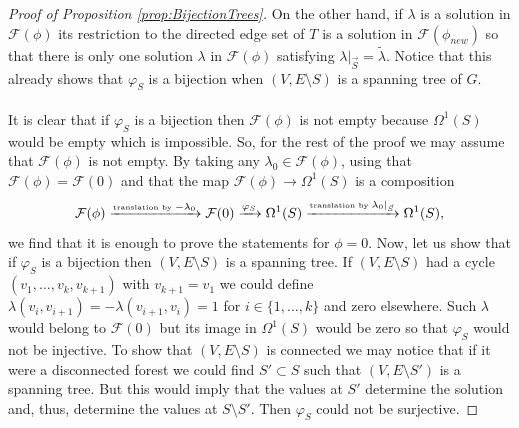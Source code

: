 \documentclass[11pt,a4paper]{amsart}
\numberwithin{equation}{section}
\theoremstyle{definition}
\begin{document}
\begin{proof}[Proof of Proposition
\ref{prop:BijectionTrees}]
	On the other hand,
	if $\lambda$ is a solution in $\mathcal F(\phi)$
	its restriction to the directed edge set of $T$
	is a solution in $\mathcal F(\phi_{new})$
	so that there is only 
	one solution $\lambda$ in $\mathcal F(\phi)$
	satisfying $\lambda|_{\vec S} = \widetilde \lambda$.
	Notice that this already
	shows that $\varphi_S$ is a bijection
	when $(V,E\setminus S)$ is a spanning tree of $G$.
	\\
	\\
	It is clear that if $\varphi_S$ is a bijection
	then $\mathcal F(\phi)$ is not empty
	because $\Omega^1(S)$ would be empty which
	is impossible. So, for
	the rest of the proof we may assume that
	$\mathcal F(\phi)$ is not empty.
	By taking any $\lambda_0 \in \mathcal F(\phi)$, using that
	$\mathcal F(\phi)
	= \mathcal F(0) $ 
	and that
	the map
	$\mathcal F(\phi) \to \Omega^1(S)$
	is a composition
	\[\mathcal F(\phi)
	\xrightarrow[]{\tiny \mbox{translation by } - \lambda_0}
	\mathcal F(0)
		\xrightarrow[]{\varphi_S}
	\Omega^1(S) 
		\xrightarrow[]{\tiny \mbox{translation by }  
			\lambda_0|_{\vec S}}
	\Omega^1(S),\]
	we find
	that it is enough to prove the statements
	for $\phi=0$.
	Now, let us show that if $\varphi_S$ is a
	bijection then $(V,E\setminus S)$ is a spanning tree.
	If $(V,E\setminus S)$ had a cycle
	$(v_1,\dots,v_k, v_{k+1})$ with $v_{k+1} = v_1$ we could define
	$\lambda(v_i,v_{i+1}) = - \lambda(v_{i+1},v_i) =1$
	for $i \in \{1,\dots,k\}$ and zero elsewhere.
	Such $\lambda$ would belong to $\mathcal F(0)$
	but its image in $\Omega^1(S)$ would be zero
	so that $\varphi_S$
	would not be injective. To show that
	$(V,E\setminus S)$ is connected we may notice that if
	it were a disconnected forest we could find
	$S' \subset S$ such that
	$(V,E\setminus S')$ is a spanning tree. But this
	would imply that the values at $S'$ determine
	the solution and, thus, determine the
	values at $S \setminus S'$. Then $\varphi_{S}$
	could not be surjective. 
	
\end{proof}
\end{document}
